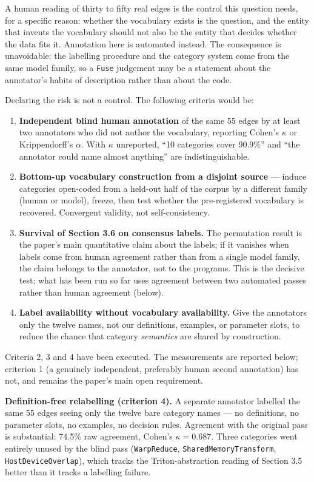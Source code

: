 \documentclass[
  11pt,
]{article}
\providecommand{\tightlist}{%
  \setlength{\itemsep}{0pt}\setlength{\parskip}{0pt}}
\begin{document}
A human reading of thirty to fifty real edges is the control this question needs, for a specific reason: whether the vocabulary exists is the question, and the entity that invents the vocabulary should not also be the entity that decides whether the data fits it. Annotation here is automated instead. The consequence is unavoidable: the labelling procedure and the category system come from the same model family, so a \texttt{Fuse} judgement may be a statement about the annotator's habits of description rather than about the code.

Declaring the risk is not a control. The following criteria would be:

\begin{enumerate}
\def\labelenumi{\arabic{enumi}.}
\tightlist
\item
  \textbf{Independent blind human annotation} of the same 55 edges by at least two annotators who did not author the vocabulary, reporting Cohen's \(\kappa\) or Krippendorff's \(\alpha\). With \(\kappa\) unreported, ``10 categories cover 90.9\%'' and ``the annotator could name almost anything'' are indistinguishable.
\item
  \textbf{Bottom-up vocabulary construction from a disjoint source} --- induce categories open-coded from a held-out half of the corpus by a different family (human or model), freeze, then test whether the pre-registered vocabulary is recovered. Convergent validity, not self-consistency.
\item
  \textbf{Survival of Section 3.6 on consensus labels.} The permutation result is the paper's main quantitative claim about the labels; if it vanishes when labels come from human agreement rather than from a single model family, the claim belongs to the annotator, not to the programs. This is the decisive test; what has been run so far uses agreement between two automated passes rather than human agreement (below).
\item
  \textbf{Label availability without vocabulary availability.} Give the annotators only the twelve names, not our definitions, examples, or parameter slots, to reduce the chance that category \emph{semantics} are shared by construction.
\end{enumerate}

Criteria 2, 3 and 4 have been executed. The measurements are reported below; criterion 1 (a genuinely independent, preferably human second annotation) has not, and remains the paper's main open requirement.

\textbf{Definition-free relabelling (criterion 4).} A separate annotator labelled the same 55 edges seeing only the twelve bare category names --- no definitions, no parameter slots, no examples, no decision rules. Agreement with the original pass is substantial: 74.5\% raw agreement, Cohen's \(\kappa = 0.687\). Three categories went entirely unused by the blind pass (\texttt{WarpReduce}, \texttt{SharedMemoryTransform}, \texttt{HostDeviceOverlap}), which tracks the Triton-abstraction reading of Section 3.5 better than it tracks a labelling failure.
\end{document}
